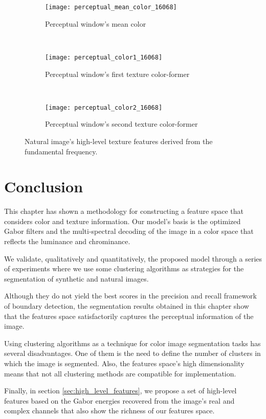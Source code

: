 \begin{figure}[!ht]
    \centering
    \begin{subfigure}[b]{0.7\textwidth}
    	\texttt{[image: perceptual\_mean\_color\_16068]}
        \caption{Perceptual window's mean color}
        \label{fig:perceptual_mean_color_16068}
    \end{subfigure}\\
    \begin{subfigure}[b]{0.7\textwidth}
    	\texttt{[image: perceptual\_color1\_16068]}
        \caption{Perceptual window's first texture color-former}
        \label{fig:perceptual_color1_16068}
    \end{subfigure}\\
    \begin{subfigure}[b]{0.7\textwidth}
    	\texttt{[image: perceptual\_color2\_16068]}
        \caption{Perceptual window's second texture color-former}
        \label{fig:perceptual_color2_16068}
    \end{subfigure}    
                  
    \caption{Natural image's high-level texture features derived from the fundamental frequency.}\label{fig:colors_high_level_features_zebre}    
\end{figure}


\section{Conclusion}
This chapter has shown a methodology for constructing a feature space that considers color and texture information. Our model's basis is the optimized Gabor filters and the multi-spectral decoding of the image in a color space that reflects the luminance and chrominance.

We validate, qualitatively and quantitatively, the proposed model through a series of experiments where we use some clustering algorithms as strategies for the segmentation of synthetic and natural images.

Although they do not yield the best scores in the precision and recall framework of boundary detection, the segmentation results obtained in this chapter show that the features space satisfactorily captures the perceptual information of the image.

Using clustering algorithms as a technique for color image segmentation tasks has several disadvantages. One of them is the need to define the number of clusters in which the image is segmented. Also, the features space's high dimensionality means that not all clustering methods are compatible for implementation.

Finally, in section \ref{sec:high_level_features}, we propose a set of high-level features based on the Gabor energies recovered from the image's real and complex channels that also show the richness of our features space.

